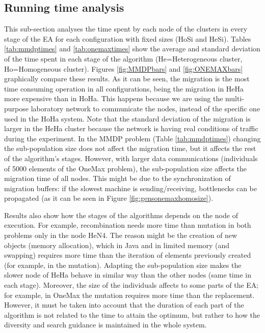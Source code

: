 \subsection{Running time analysis}

This sub-section analyses the time spent by each node of the clusters in every stage of the EA for each configuration with fixed sizes (HoSi and HeSi). Tables \ref{tab:mmdptimes} and \ref{tab:onemaxtimes} show the average and standard deviation of the time spent in each stage of the algorithm (He=Heterogeneous cluster, Ho=Homogeneous cluster). Figures \ref{fig:MMDPbars} and \ref{fig:ONEMAXbars} graphically compare these results. As it can be seen, the migration is the most time consuming operation in all configurations, being the migration in HeHa more expensive than in HoHa. This happens because we are using the multi-purpose laboratory network to communicate the nodes, instead of the specific one used in the HoHa system. Note that the standard deviation of the migration is larger in the HeHa cluster because the network is having real conditions of traffic during the experiment. In the MMDP problem (Table \ref{tab:mmdptimes}) changing the sub-population size does not affect the migration time, but it affects the rest of the algorithm's stages. However, with larger data communications (individuals of 5000 elements of the OneMax problem), the sub-population size affects the migration time of all nodes. This might be due to the synchronization of migration buffers: if the slowest machine is sending/receiving, bottlenecks can be propagated (as it can be seen in Figure \ref{fig:gensonemaxhomosize}). 

Results also show how the stages of the algorithms depends on the node
of execution. For example, recombination needs more time than mutation
in both problems only in the node HeN4. The reason might be the
creation of new objects (memory allocation), which in Java and in
limited memory (and swapping) requires more time than the iteration of
elements previously created (for example, in the mutation). Adapting
the sub-population size makes the slower node of HeHa behave in similar
way than the other nodes (same time in each stage). Moreover, the size
of the individuals affects to some parts of the EA; for example, in 
OneMax the mutation requires more time than the replacement. However,
it must be taken into account that the duration of each part of the
algorithm is not related to the time to attain the optimum, but rather to
how the diversity and search guidance is maintained in the whole system.  

